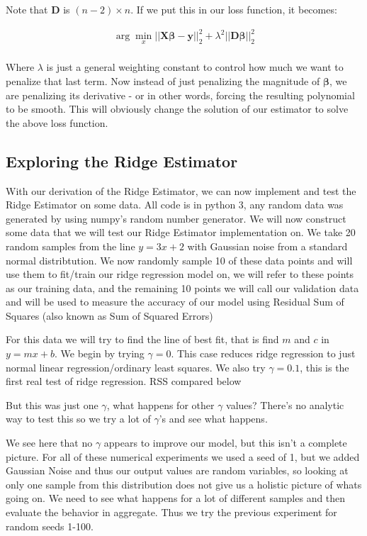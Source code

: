 \documentclass{article}
\newcommand{\y}{\mathbf{y}}
\newcommand{\X}{\mathbf{X}}
\newcommand{\B}{\boldsymbol\beta} %
\newcommand{\D}{\mathbf{D}}
\begin{document}
Note that $\D$ is $(n-2) \times n $. If we put this in our loss function, it becomes: 

\begin{align*}
\arg \min_{x} ||\X\B-\y||_{2}^{2} + \lambda^2||\D \B||_{2}^{2} \\
\end{align*}

Where $\lambda$ is just a general weighting constant to control how much we want to penalize that last term. Now instead of just penalizing the magnitude of $\B$, we are penalizing its derivative - or in other words, forcing the resulting polynomial to be smooth. This will obviously change the solution of our estimator to solve the above loss function. 

\subsection{Exploring the Ridge Estimator}

With our derivation of the Ridge Estimator, we can now implement and test the Ridge Estimator on some data.
All code is in python 3, any random data was generated by using numpy's random number generator. We will now construct
some data that we will test our Ridge Estimator implementation on. We take 20 random samples from the line $y = 3x + 2$ with Gaussian noise from a standard
normal distribtution. We now randomly sample 10 of these data points and will use them to fit/train our ridge regression model on, we will refer to these points as our 
training data, and the remaining 10 points we will call our validation data and will be used to measure the accuracy of our model using Residual Sum of Squares (also known as Sum of Squared Errors)

For this data we will try to find the line of best fit, that is find $m$ and $c$ in $y = mx + b$. We begin by trying $\gamma = 0$. This case reduces ridge regression to 
just normal linear regression/ordinary least squares. We also try $\gamma = 0.1$, this is the first real test of ridge regression. RSS compared below

But this was just one $\gamma$, what happens for other $\gamma$ values? There's no analytic way to test this so we try a lot of $\gamma$'s and see what happens. 


We see here that no $\gamma$ appears to improve our model, but this isn't a complete picture. For all of these numerical experiments we used a seed of 1, but we added Gaussian Noise and thus our output values are random variables,
so looking at only one sample from this distribution does not give us a holistic picture of whats going on. We need to see what happens for a lot of different samples and then evaluate the behavior in aggregate. Thus we try the previous experiment for random seeds 1-100.
\end{document}
